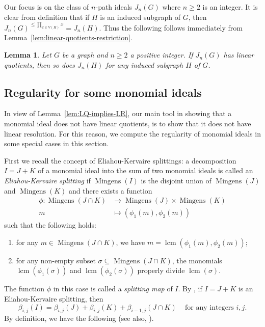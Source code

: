 \documentclass{amsart}
\newtheorem{lemma}[theorem]{Lemma}
\theoremstyle{remark}
\theoremstyle{definition}
\DeclareMathOperator{\lcm}{lcm}
\DeclareMathOperator{\mingens}{Mingens}
\begin{document}
	Our focus is on the class of $n$-path ideals $J_n(G)$ where $n\geq 2$ is an integer. It is clear from definition that if $H$ is an induced subgraph of $G$, then $J_n(G)^{\leq \prod_{x\in V(H)} x} = J_n(H)$. Thus the following follows immediately from Lemma~\ref{lem:linear-quotients-restriction}.
	
	\begin{lemma}\label{lem:linear-quotients-induced}
		Let $G$ be a graph and $n\geq 2$ a positive integer. If $J_n(G)$ has linear quotients, then so does $J_n(H)$ for any induced subgraph $H$ of $G$.
	\end{lemma}
	
	
	\subsection{Regularity for some monomial ideals}
	
	In view of Lemma~\ref{lem:LQ-implies-LR}, our main tool in showing that a monomial ideal does not have linear quotients, is to show that it does not have linear resolution. For this reason, we compute the regularity of monomial ideals in some special cases in this section.
	
	First we recall the concept of Eliahou-Kervaire splittings: a decomposition $I=J+K$ of a monomial ideal into the sum of two monomial ideals is called an \emph{Eliahou-Kervaire splitting} if $\mingens(I)$ is the disjoint union of $\mingens(J)$ and $\mingens(K)$  and there exists a function
	\begin{align*}
		\phi\colon \mingens(J\cap K) &\to \mingens(J)\times \mingens(K)\\
		m &\mapsto (\phi_1(m),\phi_2(m))
	\end{align*} such that the following holds:
	\begin{enumerate}
		\item for any $m\in \mingens(J\cap K)$, we have $m=\lcm(\phi_1(m),\phi_2(m))$;
		\item for any non-empty subset $\sigma\subseteq \mingens(J\cap K)$, the monomials $\lcm(\phi_1(\sigma))$ and $\lcm(\phi_2(\sigma))$ properly divide $\lcm(\sigma)$.
	\end{enumerate}
	The function $\phi$ in this case is called a \emph{splitting map} of $I$. By \cite[Proposition 3.2]{Fatabbi2001}, if $I=J+K$ is an Eliahou-Kervaire splitting, then 
	\[
	\beta_{i,j}(I)=\beta_{i,j}(J)+\beta_{i,j}(K)+\beta_{i-1,j}(J\cap K) \;\;\;\text{ for any integers } i,j.
	\]
	By definition, we have the following (see also, \cite[Corollary 2.2]{FHV09}).
	
\end{document}
